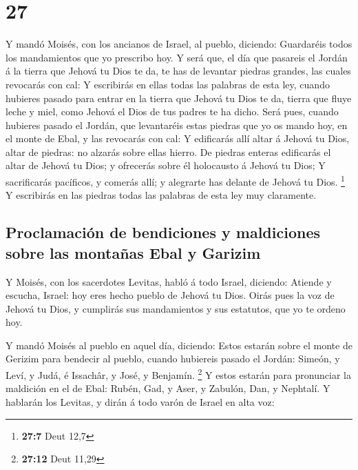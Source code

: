 \hypertarget{section-26}{%
\section{27}\label{section-26}}

 Y mandó Moisés, con los ancianos de Israel, al pueblo,
diciendo: Guardaréis todos los mandamientos que yo prescribo hoy.
 Y será que, el día que pasareis el Jordán á la tierra que
Jehová tu Dios te da, te has de levantar piedras grandes, las cuales
revocarás con cal:  Y escribirás en ellas todas las palabras
de esta ley, cuando hubieres pasado para entrar en la tierra que Jehová
tu Dios te da, tierra que fluye leche y miel, como Jehová el Dios de tus
padres te ha dicho.  Será pues, cuando hubieres pasado el
Jordán, que levantaréis estas piedras que yo os mando hoy, en el monte
de Ebal, y las revocarás con cal:  Y edificarás allí altar á
Jehová tu Dios, altar de piedras: no alzarás sobre ellas hierro.
 De piedras enteras edificarás el altar de Jehová tu Dios; y
ofrecerás sobre él holocausto á Jehová tu Dios;  Y
sacrificarás pacíficos, y comerás allí; y alegrarte has delante de
Jehová tu Dios. \footnote{\textbf{27:7} Deut 12,7}  Y
escribirás en las piedras todas las palabras de esta ley muy claramente.

\hypertarget{proclamaciuxf3n-de-bendiciones-y-maldiciones-sobre-las-montauxf1as-ebal-y-garizim}{%
\subsection{Proclamación de bendiciones y maldiciones sobre las montañas
Ebal y
Garizim}\label{proclamaciuxf3n-de-bendiciones-y-maldiciones-sobre-las-montauxf1as-ebal-y-garizim}}

 Y Moisés, con los sacerdotes Levitas, habló á todo Israel,
diciendo: Atiende y escucha, Israel: hoy eres hecho pueblo de Jehová tu
Dios.  Oirás pues la voz de Jehová tu Dios, y cumplirás sus
mandamientos y sus estatutos, que yo te ordeno hoy.

 Y mandó Moisés al pueblo en aquel día, diciendo:
 Estos estarán sobre el monte de Gerizim para bendecir al
pueblo, cuando hubiereis pasado el Jordán: Simeón, y Leví, y Judá, é
Issachâr, y José, y Benjamín. \footnote{\textbf{27:12} Deut 11,29}
 Y estos estarán para pronunciar la maldición en el de
Ebal: Rubén, Gad, y Aser, y Zabulón, Dan, y Nephtalí.  Y
hablarán los Levitas, y dirán á todo varón de Israel en alta voz:

